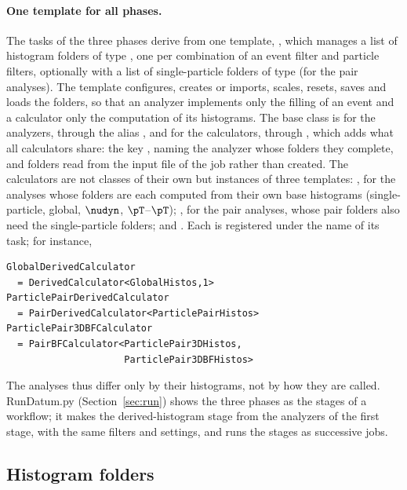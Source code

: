 \paragraph{One template for all phases.}
The tasks of the three phases derive from one template, , which
manages a list of histogram folders of type , one per combination of an event filter and 
particle filters, optionally with a list of single-particle folders of type  (for the pair analyses).
The template configures, creates or imports, scales, resets, saves and loads the folders, so that an analyzer
implements only the filling of an event and a calculator only the computation of its histograms. The base class
 is  for the analyzers, through the alias
, and  for the calculators, through
, which adds what all calculators share: the key ,
naming the analyzer whose folders they complete, and folders read from the input file of the job rather than created.
The calculators are not classes of their own but instances of three templates: ,
for the analyses whose folders are each computed from their own base histograms (single-particle, global,
$\nudyn$, $\pT$--$\pT$); , for the pair analyses, whose pair folders also need
the single-particle folders; and . Each is registered under the name of its task;
for instance,
{\footnotesize
\begin{verbatim}
GlobalDerivedCalculator
  = DerivedCalculator<GlobalHistos,1>
ParticlePairDerivedCalculator
  = PairDerivedCalculator<ParticlePairHistos>
ParticlePair3DBFCalculator
  = PairBFCalculator<ParticlePair3DHistos,
                     ParticlePair3DBFHistos>
\end{verbatim}}
\noindent The analyses thus differ only by their histograms, not by how they are called. RunDatum.py (Section~\ref{sec:run}) shows
the three phases as the stages of a workflow; it makes the derived-histogram stage from the analyzers of the first
stage, with the same filters and settings, and runs the stages as successive jobs.

\subsection{Histogram folders}
\label{sec:folders-analysis}


